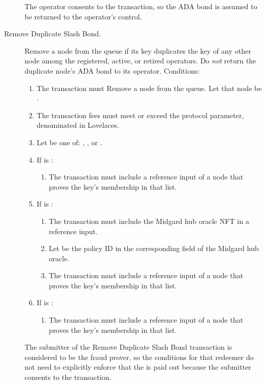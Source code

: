 \documentclass[../midgard.tex]{subfiles}
\begin{document}
\begin{description}
\begin{enumerate}
        \end{enumerate}
    The operator consents to the transaction, so the ADA bond is assumed to be returned to the operator's control.
    \item[Remove Duplicate Slash Bond.] Remove a node from the  queue if its key duplicates the key of any other node among the registered, active, or retired operators.
      Do \emph{not} return the duplicate node's ADA bond to its operator.
      Conditions:
        \begin{enumerate}
            \item The transaction must Remove a node from the  queue.
              Let that node be .
            \item The transaction fees must meet or exceed the  protocol parameter, denominated in Lovelaces.
            \item Let  be one of: , , or .
            \item If  is :
                \begin{enumerate}
                    \item The transaction must include a reference input of a  node that proves the  key's membership in that list.
                \end{enumerate}
            \item If  is :
                \begin{enumerate}
                    \item The transaction must include the Midgard hub oracle NFT in a reference input.
                    \item Let  be the policy ID in the corresponding field of the Midgard hub oracle.
                    \item The transaction must include a reference input of a  node that proves the  key's membership in that list.
                \end{enumerate}
            \item If  is :
                \begin{enumerate}
                    \item The transaction must include a reference input of a  node that proves the  key's membership in that list.
                \end{enumerate}
        \end{enumerate}
    The submitter of the Remove Duplicate Slash Bond transaction is considered to be the fraud prover, so the conditions for that redeemer do not need to explicitly enforce that the  is paid out because the submitter consents to the transaction.
\end{description}
\end{document}
